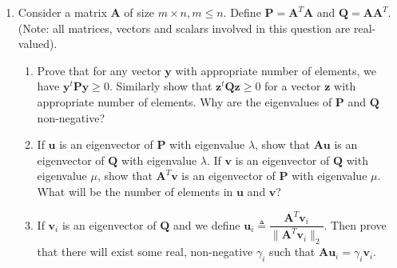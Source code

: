 \documentclass[11pt]{article}
\begin{document}
\begin{enumerate}
\item Consider a matrix $\boldsymbol{A}$ of size $m \times n, m \leq n$. Define $\boldsymbol{P} = \boldsymbol{A}^T \boldsymbol{A}$ and $\boldsymbol{Q} = \boldsymbol{A}\boldsymbol{A}^T$. (Note: all matrices, vectors and scalars involved in this question are real-valued).
\begin{enumerate}
\item Prove that for any vector $\boldsymbol{y}$ with appropriate number of elements, we have $\boldsymbol{y}^t \boldsymbol{Py} \geq 0$. Similarly show that $\boldsymbol{z}^t \boldsymbol{Qz} \geq 0$ for a vector $\boldsymbol{z}$ with appropriate number of elements. Why are the eigenvalues of $\boldsymbol{P}$ and $\boldsymbol{Q}$ non-negative?
\item If $\boldsymbol{u}$ is an eigenvector of $\boldsymbol{P}$ with eigenvalue $\lambda$, show that $\boldsymbol{Au}$ is an eigenvector of $\boldsymbol{Q}$ with eigenvalue $\lambda$. If $\boldsymbol{v}$ is an eigenvector of $\boldsymbol{Q}$ with eigenvalue $\mu$, show that $\boldsymbol{A}^T\boldsymbol{v}$ is an eigenvector of $\boldsymbol{P}$ with eigenvalue $\mu$. What will be the number of elements in $\boldsymbol{u}$ and $\boldsymbol{v}$?

\item If $\boldsymbol{v}_i$ is an eigenvector of $\boldsymbol{Q}$ and we define $\boldsymbol{u}_i \triangleq \dfrac{\boldsymbol{A}^T \boldsymbol{v}_i}{\|\boldsymbol{A}^T \boldsymbol{v}_i\|_2}$. Then prove that there will exist some real, non-negative $\gamma_i$ such that $\boldsymbol{Au}_i = \gamma_i \boldsymbol{v}_i$.


\end{enumerate}
\end{enumerate}
\end{document}
